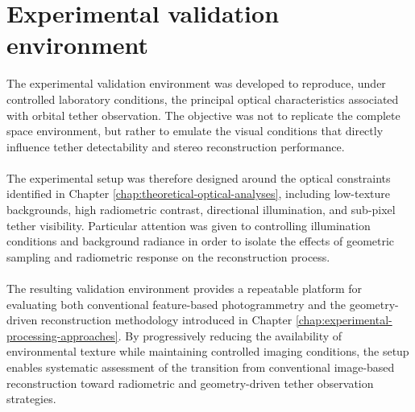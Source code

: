 \section{Experimental validation environment}
The experimental validation environment was developed to reproduce, under controlled laboratory conditions, the principal optical characteristics associated with orbital tether observation. The objective was not to replicate the complete space environment, but rather to emulate the visual conditions that directly influence tether detectability and stereo reconstruction performance.
\\\\
The experimental setup was therefore designed around the optical constraints identified in Chapter \ref{chap:theoretical-optical-analyses}, including low-texture backgrounds, high radiometric contrast, directional illumination, and sub-pixel tether visibility. Particular attention was given to controlling illumination conditions and background radiance in order to isolate the effects of geometric sampling and radiometric response on the reconstruction process.
\\\\
The resulting validation environment provides a repeatable platform for evaluating both conventional feature-based photogrammetry and the geometry-driven reconstruction methodology introduced in Chapter \ref{chap:experimental-processing-approaches}. By progressively reducing the availability of environmental texture while maintaining controlled imaging conditions, the setup enables systematic assessment of the transition from conventional image-based reconstruction toward radiometric and geometry-driven tether observation strategies.


